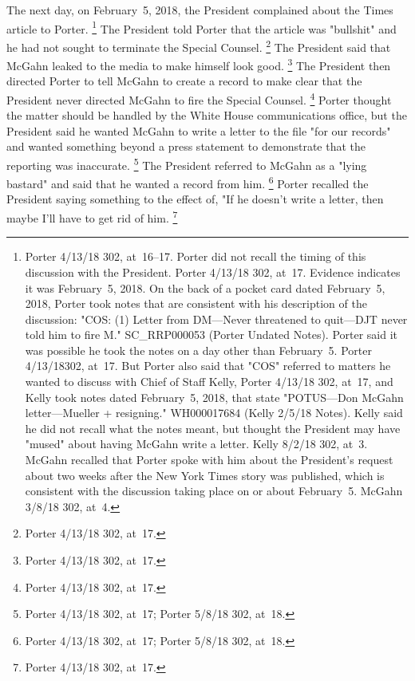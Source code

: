 The next day, on February~5, 2018, the President complained about the Times article to Porter.%
\footnote{Porter 4/13/18 302, at~16--17.
Porter did not recall the timing of this discussion with the President.
Porter 4/13/18 302, at~17.
Evidence indicates it was February~5, 2018.
On the back of a pocket card dated February~5, 2018, Porter took notes that are consistent with his description of the discussion: "COS: (1) Letter from DM---Never threatened to quit---DJT never told him to fire M."
SC\_RRP000053 (Porter Undated Notes).
Porter said it was possible he took the notes on a day other than February~5.
Porter 4/13/18302, at~17.
But Porter also said that "COS" referred to matters he wanted to discuss with Chief of Staff Kelly, Porter 4/13/18 302, at~17, and Kelly took notes dated February~5, 2018, that state "POTUS---Don McGahn letter---Mueller + resigning."
WH000017684 (Kelly 2/5/18 Notes).
Kelly said he did not recall what the notes meant, but thought the President may have "mused" about having McGahn write a letter.
Kelly 8/2/18 302, at~3.
McGahn recalled that Porter spoke with him about the President's request about two weeks after the New York Times story was published, which is consistent with the discussion taking place on or about February~5.
McGahn 3/8/18 302, at~4.}
The President told Porter that the article was "bullshit" and he had not sought to terminate the Special Counsel.%
\footnote{Porter 4/13/18 302, at~17.}
The President said that McGahn leaked to the media to make himself look good.%
\footnote{Porter 4/13/18 302, at~17.}
The President then directed Porter to tell McGahn to create a record to make clear that the President never directed McGahn to fire the Special Counsel.%
\footnote{Porter 4/13/18 302, at~17.}
Porter thought the matter should be handled by the White House communications office, but the President said he wanted McGahn to write a letter to the file "for our records" and wanted something beyond a press statement to demonstrate that the reporting was inaccurate.%
\footnote{Porter 4/13/18 302, at~17;
Porter 5/8/18 302, at~18.}
The President referred to McGahn as a "lying bastard" and said that he wanted a record from him.%
\footnote{Porter 4/13/18 302, at~17;
Porter 5/8/18 302, at~18.}
Porter recalled the President saying something to the effect of, "If he doesn't write a letter, then maybe I'll have to get rid of him.%
\footnote{Porter 4/13/18 302, at~17.}

